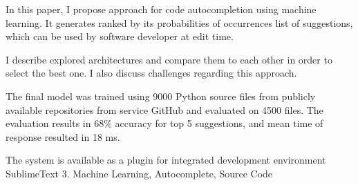 \documentclass[
    left=2.5cm,         %
    right=2.5cm,        %
    top=2.5cm,          %
    bottom=3cm,         %
    bindingoffset=6mm,  %
    nohyphenation=false %
]{eiti/eiti-thesis}
\begin{document}
In this paper, I propose approach for code autocompletion using machine learning. It generates 
ranked by its probabilities of occurrences list of suggestions, which can be used by software developer at edit time. 

I describe explored architectures and compare them to each other in order to select the best one. I 
also discuss challenges regarding this approach. 

The final model was trained using 9000 Python source files from publicly available repositories from service
GitHub and evaluated on 4500 files. The evaluation results in \begin{math}68\%\end{math}
accuracy for top 5 suggestions, and mean time of response resulted in 18 ms. 

The system is available as a plugin for integrated development environment SublimeText 3. 
\keywords Machine Learning, Autocomplete, Source Code 

\cleardoublepage  %
\pagestyle{plain}
\makeauthorship

\cleardoublepage %
\tableofcontents

\cleardoublepage %
\pagestyle{headings}






\cleardoublepage %
\printbibliography

\newpage
\pagestyle{plain}

\vspace{0.8cm}
\acronymlist
{}
\end{document}

